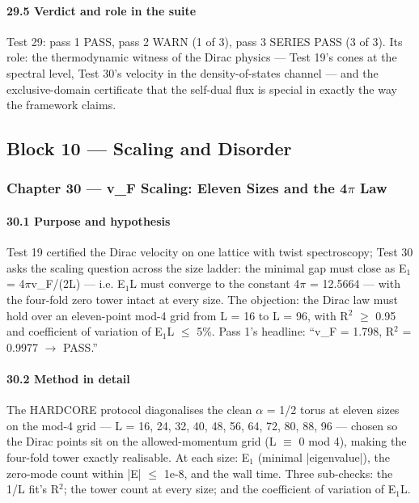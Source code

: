 \documentclass[10pt]{article}
\begin{document}
\paragraph{29.5 Verdict and role in the suite}

Test 29: pass 1 PASS, pass 2 WARN (1 of 3), pass 3 SERIES PASS (3 of 3). Its role: the thermodynamic witness of the Dirac physics --- Test 19's cones at the spectral level, Test 30's velocity in the density-of-states channel --- and the exclusive-domain certificate that the self-dual flux is special in exactly the way the framework claims.

\subsection{Block 10 --- Scaling and Disorder}

\subsubsection{Chapter 30 --- v\_F Scaling: Eleven Sizes and the 4$\pi$ Law}

\paragraph{30.1 Purpose and hypothesis}

Test 19 certified the Dirac velocity on one lattice with twist spectroscopy; Test 30 asks the scaling question across the size ladder: the minimal gap must close as E$_1$ = 4$\pi$\textperiodcentered{}v\_F/(2L) --- i.e. E$_1$\textperiodcentered{}L must converge to the constant 4$\pi$ = 12.5664 --- with the four-fold zero tower intact at every size. The objection: the Dirac law must hold over an eleven-point mod-4 grid from L = 16 to L = 96, with R$^2$ $\ge$ 0.95 and coefficient of variation of E$_1$\textperiodcentered{}L $\le$ 5\%. Pass 1's headline: ``v\_F = 1.798, R$^2$ = 0.9977 $\rightarrow$ PASS.''

\paragraph{30.2 Method in detail}

The HARDCORE protocol diagonalises the clean $\alpha$ = 1/2 torus at eleven sizes on the mod-4 grid --- L = 16, 24, 32, 40, 48, 56, 64, 72, 80, 88, 96 --- chosen so the Dirac points sit on the allowed-momentum grid (L $\equiv$ 0 mod 4), making the four-fold tower exactly realisable. At each size: E$_1$ (minimal |eigenvalue|), the zero-mode count within |E| $\le$ 1e-8, and the wall time. Three sub-checks: the 1/L fit's R$^2$; the tower count at every size; and the coefficient of variation of E$_1$\textperiodcentered{}L.
\end{document}
